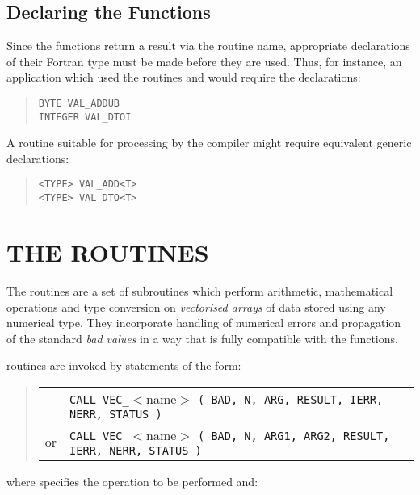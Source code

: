 \subsection{Declaring the  Functions}

Since the  functions return a result via the routine name,
appropriate declarations of their Fortran type must be made before they are
used.
Thus, for instance, an application which used the routines 
and  would require the declarations:

\begin{quote}
\verb#BYTE VAL_ADDUB#\\
\verb#INTEGER VAL_DTOI#
\end{quote}

A routine suitable for processing by the  compiler might
require equivalent generic declarations:

\begin{quote}
\verb#<TYPE> VAL_ADD<T>#\\
\verb#<TYPE> VAL_DTO<T>#
\end{quote}

\section{THE  ROUTINES}

\label{section:vec}

The  routines are a set of subroutines which perform arithmetic,
mathematical operations and type conversion on {\em vectorised arrays} of
data stored using any numerical type.
They incorporate handling of numerical errors and propagation of the
standard {\em bad values} in a way that is fully compatible with the
 functions.

 routines are invoked by statements of the form:

\begin{quote}
\begin{tabular}{rl}
& \verb#CALL VEC_#$<$name$>$
\verb#( BAD, N, ARG, RESULT, IERR, NERR, STATUS )#\\
or & \verb#CALL VEC_#$<$name$>$
\verb#( BAD, N, ARG1, ARG2, RESULT, IERR, NERR, STATUS )#
\end{tabular}
\end{quote}

where  specifies the operation to be performed and:

